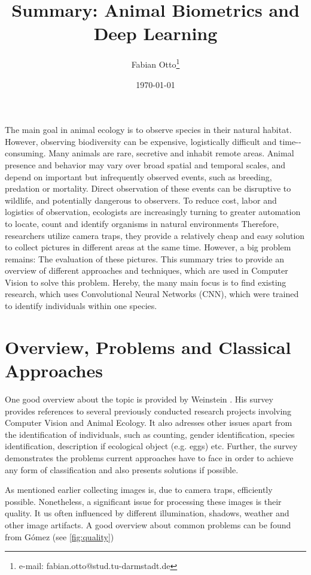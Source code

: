 \documentclass[electronic]{vgtc}             %
\title{Summary: Animal Biometrics and Deep Learning} %
\author{Fabian Otto\thanks{e-mail: fabian.otto@stud.tu-darmstadt.de}}
\affiliation{\scriptsize Technische Universit\"at Darmstadt}
\date{\today}
\begin{document}
	\maketitle
	
	The main goal in animal ecology is to observe species in their natural habitat.
	However, observing biodiversity can be expensive, logistically difficult and time-­consuming.
	Many animals are rare, secretive and inhabit remote 	areas. Animal presence and behavior may vary over broad spatial	and temporal scales, and depend on important but infrequently observed events, such as breeding, predation or mortality. Direct observation of these events can be disruptive to wildlife, and potentially	dangerous to observers.
	To reduce cost, labor and logistics of observation, ecologists are increasingly turning to greater automation to locate, count and identify organisms in natural environments
	Therefore, researchers utilize camera traps, they provide a relatively cheap and easy solution to collect pictures in different areas at the same time. However, a big problem remains: The evaluation of these pictures.
	This summary tries to provide an overview of different approaches and techniques, which are used in Computer Vision to solve this problem. 
	Hereby, the many main focus is to find existing research, which uses Convolutional Neural Networks (CNN), which were trained to identify individuals within one species.

	\section{Overview, Problems and Classical Approaches\label{sec:problems}}
	One good overview about the topic is provided by Weinstein \cite{Weinstein:2017}.
	His survey provides references to several previously conducted research projects involving Computer Vision and Animal Ecology. It also adresses other issues apart from the identification of individuals, such as counting, gender identification, species identification, description if ecological object (e.g. eggs) etc. 
	Further, the survey demonstrates the problems current approaches have to face in order to achieve any form of classification and also presents solutions if possible.
	
	As mentioned earlier collecting images is, due to camera traps, efficiently possible. Nonetheless, a significant issue for processing these images is their quality. It us often influenced by different illumination, shadows, weather and other image artifacts. A good overview about common problems can be found from G\'omez \cite{Gomez:2016:Low} (see \autoref{fig:quality})
	
\end{document}
